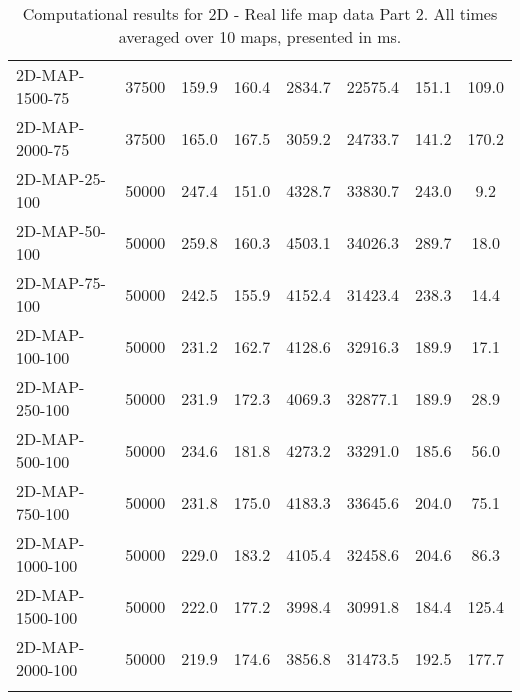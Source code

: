 \documentclass{article}
\begin{document}
\begin{center}
\begin{table}[h]
\begin{tabular}{|l||c|c|c|c|c|c|c|}
        2D-MAP-1500-75 & 37500 & 159.9 & 160.4 & 2834.7 & 22575.4 & 151.1 & 109.0 \\
        2D-MAP-2000-75 & 37500 & 165.0 & 167.5 & 3059.2 & 24733.7 & 141.2 & 170.2 \\
        \hline
        2D-MAP-25-100 & 50000 & 247.4 & 151.0 & 4328.7 & 33830.7 & 243.0 & 9.2 \\
        2D-MAP-50-100 & 50000 & 259.8 & 160.3 & 4503.1 & 34026.3 & 289.7 & 18.0 \\
        2D-MAP-75-100 & 50000 & 242.5 & 155.9 & 4152.4 & 31423.4 & 238.3 & 14.4 \\
        2D-MAP-100-100 & 50000 & 231.2 & 162.7 & 4128.6 & 32916.3 & 189.9 & 17.1 \\
        2D-MAP-250-100 & 50000 & 231.9 & 172.3 & 4069.3 & 32877.1 & 189.9 & 28.9 \\
        2D-MAP-500-100 & 50000 & 234.6 & 181.8 & 4273.2 & 33291.0 & 185.6 & 56.0 \\
        2D-MAP-750-100 & 50000 & 231.8 & 175.0 & 4183.3 & 33645.6 & 204.0 & 75.1 \\
        2D-MAP-1000-100 & 50000 & 229.0 & 183.2 & 4105.4 & 32458.6 & 204.6 & 86.3 \\
        2D-MAP-1500-100 & 50000 & 222.0 & 177.2 & 3998.4 & 30991.8 & 184.4 & 125.4 \\
        2D-MAP-2000-100 & 50000 & 219.9 & 174.6 & 3856.8 & 31473.5 & 192.5 & 177.7 \\
        \hline
        \caption{Computational results for 2D - Real life map data Part 2. All times averaged over 10 maps, presented in ms.}
        \end{tabular}
    \end{table}
\end{center}
\restoregeometry
\end{document}
